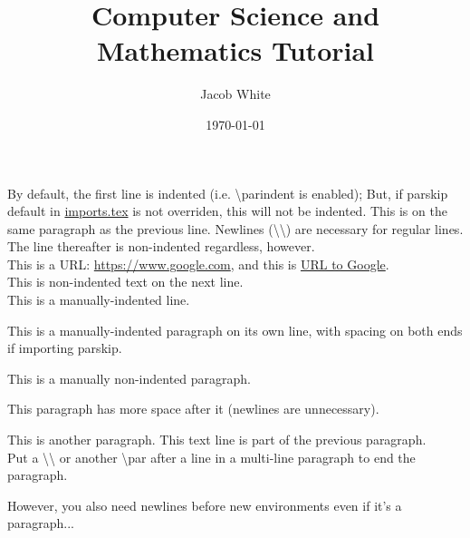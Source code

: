 \documentclass{article}
\title{Computer Science and Mathematics Tutorial}
\author{Jacob White}
\date{\today}
\begin{document}
\maketitle

By default, the first line is indented (i.e. \textbackslash{parindent} is enabled); But, if parskip default in \href{run:./imports.tex}{imports.tex} is not overriden, this will not be indented.
This is on the same paragraph as the previous line. Newlines (\textbackslash \textbackslash) are necessary for regular lines.\\
The line thereafter is non-indented regardless, however.\\
This is a URL: \url{https://www.google.com}, and this is \href{https://www.google.com}{URL to Google}.\\
This is non-indented text on the next line.\\
\indent This is a manually-indented line.
\par\indent This is a manually-indented paragraph on its own line, with spacing on both ends if importing parskip.
\par\noindent This is a manually non-indented paragraph.
\par This paragraph has more space after it (newlines are unnecessary). \\
\par This is another paragraph.
This text line is part of the previous paragraph.\\
Put a \textbackslash\textbackslash\xspace or another \textbackslash{par} after a line in a multi-line paragraph to end the paragraph. 
\par\noindent However, you also need newlines before new environments even if it's a paragraph...\\
\end{document}
